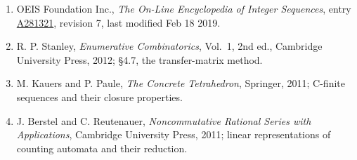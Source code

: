 \documentclass[11pt]{article}
\theoremstyle{definition}
\begin{document}
\begin{enumerate}

\item OEIS Foundation Inc., \emph{The On-Line Encyclopedia of Integer Sequences}, entry \href{https://oeis.org/A281321}{A281321}, revision 7, last modified Feb 18 2019.

\item R. P. Stanley, \emph{Enumerative Combinatorics}, Vol.~1, 2nd ed., Cambridge University Press, 2012; \S4.7, the transfer-matrix method.

\item M. Kauers and P. Paule, \emph{The Concrete Tetrahedron}, Springer, 2011; C-finite sequences and their closure properties.

\item J. Berstel and C. Reutenauer, \emph{Noncommutative Rational Series with Applications}, Cambridge University Press, 2011; linear representations of counting automata and their reduction.

\end{enumerate}
\end{document}
